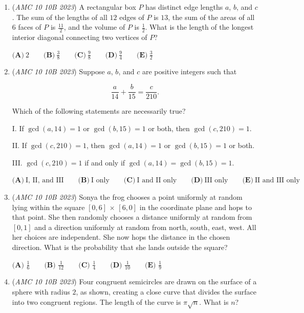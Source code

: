 \begin{enumerate}
 $\textbf{(A)}~512\qquad\textbf{(B)}~10\qquad\textbf{(C)}~0\qquad\textbf{(D)}~9\qquad\textbf{(E)}~511$


	\item (\textit{AMC 10 10B 2023}) A rectangular box $P$ has distinct edge lengths $a$, $b$, and $c$. The sum of the lengths of
all $12$ edges of $P$ is $13$, the sum of the areas of all $6$ faces of $P$ is $\frac{11}{2}$, and the volume of $P$ is $\frac{1}{2}$. What is the length of the longest interior diagonal connecting two vertices of $P$?


 $\textbf{(A)}~2\qquad\textbf{(B)}~\frac{3}{8}\qquad\textbf{(C)}~\frac{9}{8}\qquad\textbf{(D)}~\frac{9}{4}\qquad\textbf{(E)}~\frac{3}{2}$


	\item (\textit{AMC 10 10B 2023}) Suppose $a$, $b$, and $c$ are positive integers such that

 \[\dfrac{a}{14}+\dfrac{b}{15}=\dfrac{c}{210}.\]


 Which of the following statements are necessarily true?


 I. If $\gcd(a,14)=1$ or $\gcd(b,15)=1$ or both, then $\gcd(c,210)=1$.


 II. If $\gcd(c,210)=1$, then $\gcd(a,14)=1$ or $\gcd(b,15)=1$ or both.


 III. $\gcd(c,210)=1$ if and only if $\gcd(a,14)=\gcd(b,15)=1$.


 \(\textbf{(A)}~\text{I, II, and III}\qquad\textbf{(B)}~\text{I only}\qquad\textbf{(C)}~\text{I and II only}\qquad\textbf{(D)}~\text{III only}\qquad\textbf{(E)}~\text{II and III only}\)


 

	\item (\textit{AMC 10 10B 2023}) Sonya the frog chooses a point uniformly at random lying within the square
$[0, 6]$ $\times$ $[6, 0]$ in the coordinate plane and hops to that point. She then randomly
chooses a distance uniformly at random from $[0, 1]$ and a direction uniformly at
random from {north, south, east, west}. All her choices are independent. She now
hops the distance in the chosen direction. What is the probability that she lands
outside the square?


 $\textbf{(A) } \frac{1}{6} \qquad \textbf{(B) } \frac{1}{12} \qquad \textbf{(C) } \frac{1}{4} \qquad \textbf{(D) } \frac{1}{10} \qquad \textbf{(E) } \frac{1}{9}$


	\item (\textit{AMC 10 10B 2023}) Four congruent semicircles are drawn on the surface of a sphere with radius $2$, as
shown, creating a close curve that divides the surface into two congruent regions.
The length of the curve is $\pi\sqrt{n}$. What is $n$?



\end{enumerate}
